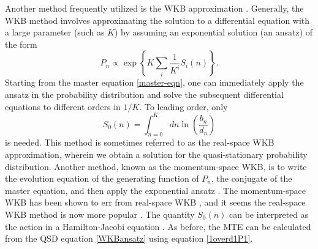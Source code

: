 Another method frequently utilized is the WKB approximation \cite{Doering2005,Assaf2006,Kessler2007,Kamenev2008,Assaf2010,Ovaskainen2010,Gottesman2012,Assaf2016,Yu2017}. 
Generally, the WKB method involves approximating the solution to a differential equation with a large parameter (such as $K$) by assuming an exponential solution (an ansatz) of the form \cite{Assaf2016}
\begin{equation}
P_n \propto \exp \left\{ K \sum_i \frac{1}{K^i}S_i(n) \right\}.
 \label{WKBansatz}
\end{equation}
Starting from the master equation \ref{master-eqn}, one can immediately apply the ansatz in the probability distribution and solve the subsequent differential equations to different orders in $1/K$\cite{Assaf2016}. %
To leading order, only 
\begin{equation}
S_0(n) = \int_{n=0}^{K} dn \ln\left(\frac{b_n}{d_n}\right)
 \label{WKBaction}
\end{equation}
is needed. 
This method is sometimes referred to as the real-space WKB approximation, wherein we obtain a solution for the quasi-stationary probability distribution.
Another method, known as the momentum-space WKB, is to write the evolution equation of the generating function of $P_n$, the conjugate of the master equation, and then apply the exponential ansatz \cite{Assaf2006,Assaf2016}. 
The momentum-space WKB has been shown to err from real-space WKB \cite{Ovaskainen2010,Assaf2016}, and it seems the real-space WKB method is now more popular \cite{Kessler2007,Kamenev2008,Assaf2010,Ovaskainen2010,Gottesman2012,Assaf2016,Yu2017}. 
The quantity $S_0(n)$ can be interpreted as the action in a Hamilton-Jacobi equation \cite{Assaf2016}. 
As before, the MTE can be calculated from the QSD equation \ref{WKBansatz} using equation \ref{1overd1P1}. 

